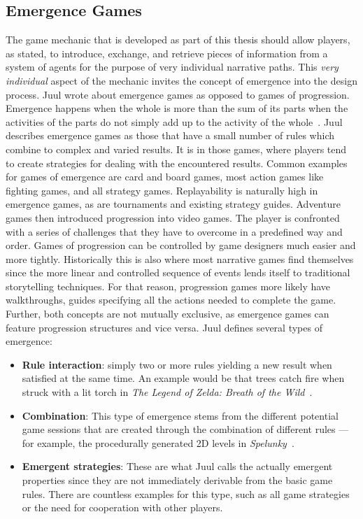 \subsection{Emergence Games}
The game mechanic that is developed as part of this thesis should allow players, as stated, to introduce, exchange, and retrieve pieces of information from a system of agents for the purpose of very individual narrative paths. This \textit{very individual} aspect of the mechanic invites the concept of emergence into the design process. Juul wrote about emergence games as opposed to games of progression.\\
Emergence happens when the whole is more than the sum of its parts when the activities of the parts do not simply add up to the activity of the whole~\cite{Holland2000}. Juul describes emergence games as those that have a small number of rules which combine to complex and varied results. It is in those games, where players tend to create strategies for dealing with the encountered results. Common examples for games of emergence are card and board games, most action games like fighting games, and all strategy games. Replayability is naturally high in emergence games, as are tournaments and existing strategy guides. Adventure games then introduced progression into video games. The player is confronted with a series of challenges that they have to overcome in a predefined way and order. Games of progression can be controlled by game designers much easier and more tightly. Historically this is also where most narrative games find themselves since the more linear and controlled sequence of events lends itself to traditional storytelling techniques. For that reason, progression games more likely have walkthroughs, guides specifying all the actions needed to complete the game.~\cite{Juul2002}\\
Further, both concepts are not mutually exclusive, as emergence games can feature progression structures and vice versa. Juul defines several types of emergence:
\begin{itemize}
	\item \textbf{Rule interaction}: simply two or more rules yielding a new result when satisfied at the same time. An example would be that trees catch fire when struck with a lit torch in \textit{The Legend of Zelda: Breath of the Wild}~\cite{zeldabotw}.
	\item \textbf{Combination}: This type of emergence stems from the different potential game sessions that are created through the combination of different rules — for example, the procedurally generated 2D levels in \textit{Spelunky}~\cite{spelunky}.
	\item \textbf{Emergent strategies}: These are what Juul calls the actually emergent properties since they are not immediately derivable from the basic game rules. There are countless examples for this type, such as all game strategies or the need for cooperation with other players.
\end{itemize} 
